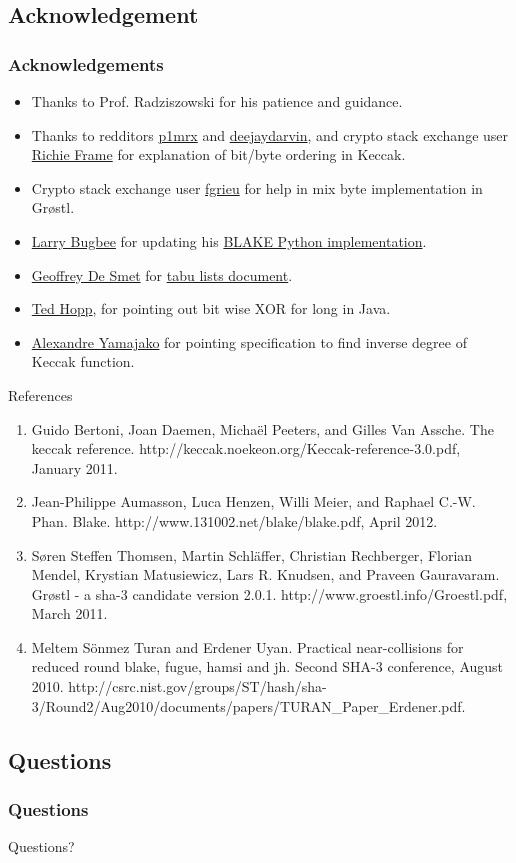 \documentclass{beamer}
\begin{document}
\subsection{Acknowledgement}

\begin{frame}
\frametitle{Acknowledgements}
\begin{itemize}
\item Thanks to Prof. Radziszowski for his patience and guidance.
\item Thanks to redditors \href{"http://www.reddit.com/user/p1mrx"}{p1mrx} and 
\href{"http://www.reddit.com/user/deejaydarvin"}{deejaydarvin}, and crypto stack exchange user 
\href{"http://crypto.stackexchange.com/users/8050/richie-frame"}{Richie Frame} for explanation of bit/byte 
ordering in Keccak.
\item Crypto stack exchange user \href{"http://crypto.stackexchange.com/users/555/fgrieu"}{fgrieu} for help
in mix byte implementation in Gr{\o}stl.
\item \href{"http://www.seanet.com/~bugbee"}{Larry Bugbee} for updating his 
\href{http://www.seanet.com/~bugbee/crypto/blake/}{BLAKE Python implementation}.
\item \href{"http://stackoverflow.com/users/472109/geoffrey-de-smet"}{Geoffrey De Smet} for 
\href{"http://docs.jboss.org/drools/release/latest/optaplanner-docs/html\_single/index.html\#tabuSearch"}
{tabu lists document}.
\item \href{"http://stackoverflow.com/users/535871/ted-hopp"}{Ted Hopp}, for pointing out bit wise XOR for long in Java.
\item \href{"http://crypto.stackexchange.com/users/4136/alexandre-yamajako"}{Alexandre Yamajako} for pointing
specification to find inverse degree of Keccak function.
\end{itemize}
\end{frame}

\begin{frame}{References}
\begin{enumerate}
\item Guido Bertoni, Joan Daemen, Micha\"{e}l Peeters, and Gilles Van Assche. The keccak 
reference. http://keccak.noekeon.org/Keccak-reference-3.0.pdf, January 2011.
\item Jean-Philippe Aumasson, Luca Henzen, Willi Meier, and Raphael C.-W. Phan. Blake.
http://www.131002.net/blake/blake.pdf, April 2012.
\item S{\o}ren Steffen Thomsen, Martin Schl\"{a}ffer, Christian Rechberger, Florian Mendel,
Krystian Matusiewicz, Lars R. Knudsen, and Praveen Gauravaram. Grøstl - a sha-3
candidate version 2.0.1. http://www.groestl.info/Groestl.pdf, March 2011.
\item Meltem S\"{o}nmez Turan and Erdener Uyan. Practical near-collisions for reduced round blake, 
fugue, hamsi and jh. Second SHA-3 conference, August 2010. 
http://csrc.nist.gov/groups/ST/hash/sha-3/Round2/Aug2010/documents/papers/TURAN\_Paper\_Erdener.pdf.
\end{enumerate}
\end{frame}

\subsection{Questions}

\begin{frame}
\frametitle{Questions}
Questions?
\end{frame}
\end{document}
